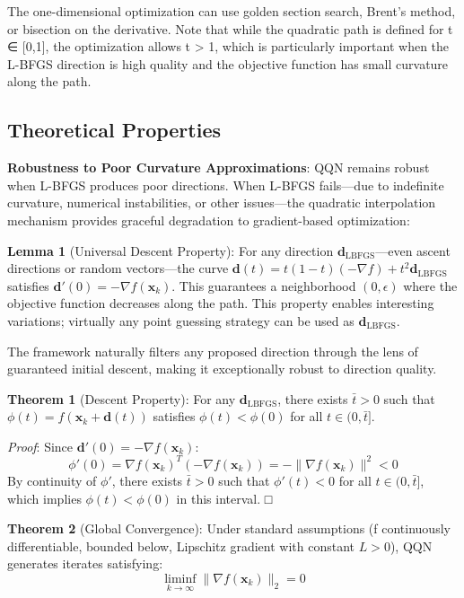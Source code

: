 The one-dimensional optimization can use golden section search, Brent's method, or bisection on the derivative.
Note that while the quadratic path is defined for t ∈ {[}0,1{]}, the optimization allows t \textgreater{} 1, which is particularly important when the L-BFGS direction is high quality and the objective function has small curvature along the path.

\hypertarget{theoretical-properties}{%
\subsection{Theoretical Properties}\label{theoretical-properties}}

\textbf{Robustness to Poor Curvature Approximations}: QQN remains robust when L-BFGS produces poor directions.
When L-BFGS fails---due to indefinite curvature, numerical instabilities, or other issues---the quadratic interpolation mechanism provides graceful degradation to gradient-based optimization:

\textbf{Lemma 1} (Universal Descent Property): For any direction \(\mathbf{d}_{\text{LBFGS}}\)---even ascent directions or random vectors---the curve \(\mathbf{d}(t) = t(1-t)(-\nabla f) + t^2 \mathbf{d}_{\text{LBFGS}}\) satisfies \(\mathbf{d}'(0) = -\nabla f(\mathbf{x}_k)\).
This guarantees a neighborhood \((0, \epsilon)\) where the objective function decreases along the path.
This property enables interesting variations; virtually any point guessing strategy can be used as \(\mathbf{d}_{\text{LBFGS}}\).

The framework naturally filters any proposed direction through the lens of guaranteed initial descent, making it exceptionally robust to direction quality.

\textbf{Theorem 1} (Descent Property): For any \(\mathbf{d}_{\text{LBFGS}}\), there exists \(\bar{t} > 0\) such that \(\phi(t) = f(\mathbf{x}_k + \mathbf{d}(t))\) satisfies \(\phi(t) < \phi(0)\) for all \(t \in (0, \bar{t}]\).

\emph{Proof}: Since \(\mathbf{d}'(0) = -\nabla f(\mathbf{x}_k)\):
\[\phi'(0) = \nabla f(\mathbf{x}_k)^T (-\nabla f(\mathbf{x}_k)) = -\|\nabla f(\mathbf{x}_k)\|^2 < 0\]
By continuity of \(\phi'\), there exists \(\bar{t} > 0\) such that \(\phi'(t) < 0\) for all \(t \in (0, \bar{t}]\), which implies \(\phi(t) < \phi(0)\) in this interval. □

\textbf{Theorem 2} (Global Convergence): Under standard assumptions (f continuously differentiable, bounded below, Lipschitz gradient with constant \(L > 0\)), QQN generates iterates satisfying:
\[\liminf_{k \to \infty} \|\nabla f(\mathbf{x}_k)\|_2 = 0\]

